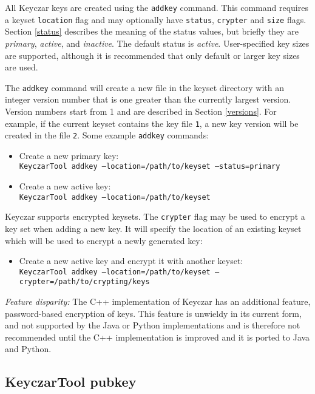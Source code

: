 \documentclass{llncs}
\begin{document}
All Keyczar keys are created using the {\tt addkey} command. This
command requires a keyset {\tt location} flag and may optionally have
{\tt status}, {\tt crypter} and {\tt size} flags. Section \ref{status}
describes the meaning of the status values, but briefly they are {\it
  primary}, {\it active}, and {\it inactive}. The default status is
{\it active}. User-specified key sizes are supported, although it is
recommended that only default or larger key sizes are used.

The {\tt addkey} command will create a new file in the keyset
directory with an integer version number that is one greater than the
currently largest version.  Version numbers start from 1 and are
described in Section \ref{versions}. For example, if the current
keyset contains the key file {\tt 1}, a new key version will be
created in the file {\tt 2}. Some example {\tt addkey} commands:


\begin{itemize}
\item Create a new primary key: \\
{\tt KeyczarTool addkey --location=/path/to/keyset --status=primary}
\item Create a new active key: \\
{\tt KeyczarTool addkey --location=/path/to/keyset} 
\end{itemize}

Keyczar supports encrypted keysets. The {\tt crypter} flag may be used
to encrypt a key set when adding a new key. It will specify the
location of an existing keyset which will be used to encrypt a newly
generated key:
 
\begin{itemize}
\item Create a new active key and encrypt it with another keyset: \\
{\tt KeyczarTool addkey --location=/path/to/keyset
--crypter=/path/to/crypting/keys}
\end{itemize}

\emph{Feature disparity:} The C++ implementation of Keyczar has an
additional feature, password-based encryption of keys.  This feature
is unwieldy in its current form, and not supported by the Java or
Python implementations and is therefore not recommended until the C++
implementation is improved and it is ported to Java and Python.

\subsection{KeyczarTool pubkey}
\end{document}
